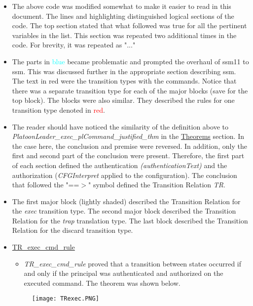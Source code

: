 \begin{itemize}
\item The above code was modified somewhat to make it easier to read in this document.
  The lines and highlighting distinguished logical sections of the code.  The top section
  stated that what followed was true for all the pertinent variables in the list.  This
  section was repeated two additional times in the code.  For brevity, it was repeated as "..."
\item The parts in \textcolor{cyan}{blue} became problematic and prompted the overhaul of ssm11 to ssm.
  This was discussed further in the appropriate section describing ssm.  The text in red
  were the transition types with the commands.  Notice that there was a separate transition
  type for each of the major blocks (save for the top block).  The blocks were also similar.
  They described the rules for one transition type denoted in \textcolor{red}{red}.
\item The reader should have noticed the similarity of the definition above to
  \textit{PlatoonLeader_exec_plCommand_justified_thm} in the \underline{Theorems} section.
  In the case here, the conclusion and premise were reversed.  In addition, only the first
  and second part of the conclusion were present.  Therefore, the first part of each section
  defined the authentication \textit{(authenticationText)} and the authorization
  (\textit{CFGInterpret} applied to the configuration).  The conclusion that followed
  the "==$>$" symbol defined the Transition Relation \textit{TR}.
\item The first major block (lightly shaded)  described the Transition Relation for
  the \textit{exec} transition type.  The second major block described the Transition Relation for
  the \textit{trap} translation type.  The last block described the Transition Relation for the
  discard transition type.
\item \underline{TR_exec_cmd_rule}
  \begin{itemize}
  \item \textit{TR_exec_cmd_rule} proved that a transition between states occurred if and only if
    the principal was authenticated and authorized on the executed command.  The theorem was shown below.
  \end{itemize}
  \begin{figure}[h]
  \centering
  \texttt{[image: TRexec.PNG]}
\end{figure}
\begin{figure}[h!]

\end{figure}
\end{itemize}
